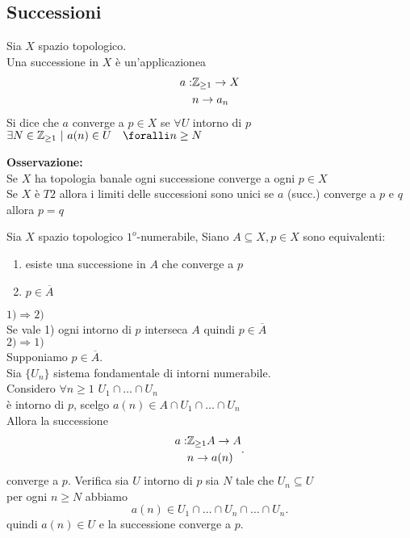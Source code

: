 \documentclass[12px]{article}
\begin{document}
\subsection{Successioni}
\begin{defi}
	Sia $X$ spazio topologico.\\
	Una successione in $X$ è un'applicazionea
	\[ \begin{aligned}
		a:&\mathbb{Z}_{\geq 1} \rightarrow X\\
		& n \rightarrow a_n
	\end{aligned}\]
	Si dice che $a$ converge a $p\in X$ se $\forall U$ intorno di $p$ $\exists N\in\Z_{\geq 1}\ | \ a(n)\in U\ \ \ \foralli n\geq N$
\end{defi}
\textbf{Osservazione:}\\
Se $X$ ha topologia banale ogni successione converge a ogni $p\in X$\\
Se $X$ è $T2$ allora i limiti delle successioni sono unici se $a$ (succ.) converge a $p$ e $q$ allora $p=q$ \\
\begin{prop}
	Sia $X$ spazio topologico $1^o$-numerabile, Siano $A\subseteq X, p\in X$ sono equivalenti:
	 \begin{enumerate}
		 \item esiste una successione in $A$ che converge a $p$ 
		 \item $p\in\overline A$
	\end{enumerate}
\end{prop}
\begin{dimo}
	$1) \Rightarrow  2)$ \\
	Se vale 1) ogni intorno di $p$ interseca $A$ quindi $p\in \overline A$ \\
	$2) \Rightarrow 1)$ \\
	Supponiamo $p\in \overline A$.\\
	Sia  $\{U_n\}$ sistema fondamentale di intorni numerabile.\\
	Considero $\forall n\geq 1$  $U_1\cap\ldots\cap U_n$\\
	è intorno di $p$, scelgo  $a(n)\in A\cap U_1\cap\ldots\cap U_n$\\
	Allora la successione 
	 \[
		 \begin{aligned}
		 a:&\mathbb{Z}_{\geq 1} A \rightarrow A\\
		   & n \rightarrow a(n)
		   \end{aligned}
	.\] 
	converge a $p$. Verifica sia $U$ intorno di  $p$ sia $N$ tale che $U_n\subseteq U$\\
	per ogni $n\geq N$ abbiamo
	 \[
		 a(n)\in U_1\cap \ldots\cap U_n\cap\ldots\cap U_n
	.\] 
	quindi $a(n)\in U$ e la successione converge a $p$.
\end{dimo}
\end{document}

